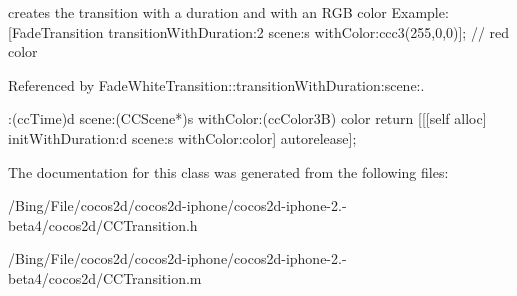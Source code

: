 creates the transition with a duration and with an R\-G\-B color Example\-: \mbox{[}Fade\-Transition transition\-With\-Duration\-:2 scene\-:s with\-Color\-:ccc3(255,0,0)\mbox{]}; // red color 

Referenced by Fade\-White\-Transition\-::transition\-With\-Duration\-:scene\-:.


\begin{DoxyCode}
                            :(ccTime)d scene:(CCScene*)s withColor:(ccColor3B)
      color
{
        return [[[self alloc] initWithDuration:d scene:s withColor:color] 
      autorelease];
}
\end{DoxyCode}


The documentation for this class was generated from the following files\-:\begin{DoxyCompactItemize}
\item 
/\-Bing/\-File/cocos2d/cocos2d-\/iphone/cocos2d-\/iphone-\/2.-\/beta4/cocos2d/C\-C\-Transition.\-h\item 
/\-Bing/\-File/cocos2d/cocos2d-\/iphone/cocos2d-\/iphone-\/2.-\/beta4/cocos2d/C\-C\-Transition.\-m\end{DoxyCompactItemize}

